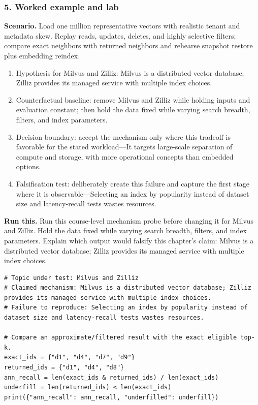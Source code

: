 \subsubsection*{5. Worked example and lab}
\textbf{Scenario.} Load one million representative vectors with realistic tenant and metadata skew. Replay reads, updates, deletes, and highly selective filters; compare exact neighbors with returned neighbors and rehearse snapshot restore plus embedding reindex.
\begin{enumerate}
\item Hypothesis for Milvus and Zilliz: Milvus is a distributed vector database; Zilliz provides its managed service with multiple index choices.
\item Counterfactual baseline: remove Milvus and Zilliz while holding inputs and evaluation constant; then hold the data fixed while varying search breadth, filters, and index parameters.
\item Decision boundary: accept the mechanism only where this tradeoff is favorable for the stated workload—It targets large-scale separation of compute and storage, with more operational concepts than embedded options.
\item Falsification test: deliberately create this failure and capture the first stage where it is observable—Selecting an index by popularity instead of dataset size and latency-recall tests wastes resources.
\end{enumerate}
\textbf{Run this.} Run this course-level mechanism probe before changing it for Milvus and Zilliz. Hold the data fixed while varying search breadth, filters, and index parameters. Explain which output would falsify this chapter's claim: Milvus is a distributed vector database; Zilliz provides its managed service with multiple index choices.
\begin{Verbatim}[fontsize=\scriptsize]
# Topic under test: Milvus and Zilliz
# Claimed mechanism: Milvus is a distributed vector database; Zilliz provides its managed service with multiple index choices.
# Failure to reproduce: Selecting an index by popularity instead of dataset size and latency-recall tests wastes resources.

# Compare an approximate/filtered result with the exact eligible top-k.
exact_ids = {"d1", "d4", "d7", "d9"}
returned_ids = {"d1", "d4", "d8"}
ann_recall = len(exact_ids & returned_ids) / len(exact_ids)
underfill = len(returned_ids) < len(exact_ids)
print({"ann_recall": ann_recall, "underfilled": underfill})
\end{Verbatim}
